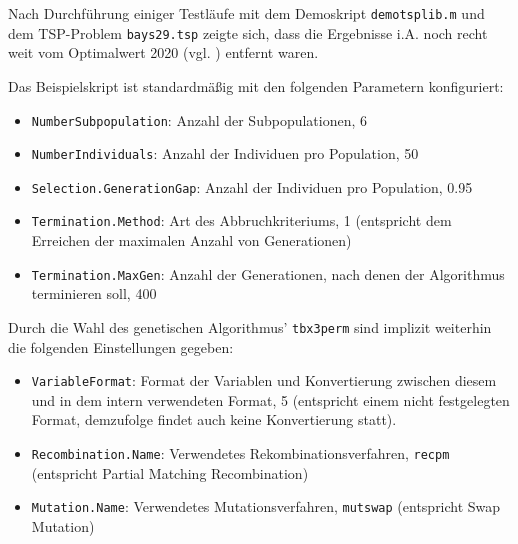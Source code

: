 Nach Durchführung einiger Testläufe mit dem Demoskript \texttt{demotsplib.m} 
und dem TSP-Problem \texttt{bays29.tsp} zeigte sich, dass die Ergebnisse i.A. 
noch recht weit vom Optimalwert 2020 (vgl. \cite[Appendix]{Reinelt94}) entfernt 
waren.

Das Beispielskript ist standardmäßig mit den folgenden Parametern konfiguriert:

\begin{itemize}
  \item \texttt{NumberSubpopulation}: Anzahl der Subpopulationen, 6
  \item \texttt{NumberIndividuals}: Anzahl der Individuen pro Population, 50
  \item \texttt{Selection.GenerationGap}: Anzahl der Individuen pro Population, 0.95
  \item \texttt{Termination.Method}: Art des Abbruchkriteriums, 1 (entspricht
  dem Erreichen der maximalen Anzahl von Generationen)
  \item \texttt{Termination.MaxGen}: Anzahl der Generationen, nach denen der
  Algorithmus terminieren soll, 400
\end{itemize}

Durch die Wahl des genetischen Algorithmus' \texttt{tbx3perm} sind implizit 
weiterhin die folgenden Einstellungen gegeben:

\begin{itemize}
  \item \texttt{VariableFormat}: Format der Variablen und Konvertierung 
  zwischen diesem und in dem intern verwendeten Format, 5 (entspricht einem 
  nicht festgelegten Format, demzufolge findet auch keine Konvertierung statt).
  \item \texttt{Recombination.Name}: Verwendetes Rekombinationsverfahren, 
  \texttt{recpm} (entspricht Partial Matching Recombination)
  \item \texttt{Mutation.Name}: Verwendetes Mutationsverfahren, \texttt{mutswap}
  (entspricht Swap Mutation)
\end{itemize}